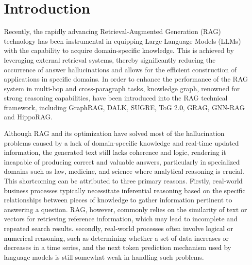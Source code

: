 \documentclass{article}
\begin{document}
\section{Introduction} 
Recently, the rapidly advancing Retrieval-Augmented Generation (RAG)\cite{gao2023retrieval,shao2023enhancing,chen2024benchmarking,fan2024survey,yu2023chain}  technology has been instrumental in equipping Large Language Models (LLMs) with the capability to acquire domain-specific knowledge. This is achieved by leveraging external retrieval systems, thereby significantly reducing the occurrence of answer hallucinations and allows for the efficient construction of applications in specific domains. In order to enhance the performance of the RAG system in multi-hop and cross-paragraph tasks, knowledge graph, renowned for strong reasoning capabilities, have been introduced into the RAG technical framework, including GraphRAG\cite{graphrag}, DALK\cite{li2024dalk}, SUGRE\cite{sugre}, ToG 2.0\cite{ma2024think}, GRAG\cite{grag}, GNN-RAG \cite{gnnrag} and HippoRAG\cite{gutierrez2024hipporag}.

Although RAG and its optimization have solved most of the hallucination problems caused by a lack of domain-specific knowledge and real-time updated information, the generated text still lacks coherence and logic, rendering it incapable of producing correct and valuable answers, particularly in specialized domains such as law, medicine, and science where analytical reasoning is crucial. This shortcoming can be attributed to three primary reasons.  Firstly, real-world business processes typically necessitate inferential reasoning based on the specific relationships between pieces of knowledge to gather information pertinent to answering a question. RAG, however, commonly relies on the similarity of text or vectors for retrieving reference information, which may lead to incomplete and repeated search results. secondly, real-world processes often involve logical or numerical reasoning, such as determining whether a set of data increases or decreases in a time series, and the next token prediction mechanism used by language models is still somewhat weak in handling such problems.
\end{document}
